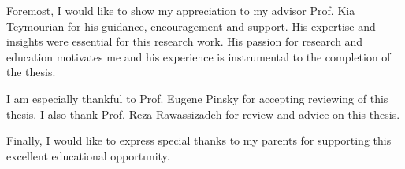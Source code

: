 Foremost, I would like to show my appreciation to my advisor Prof. Kia Teymourian for his guidance, encouragement and support.
His expertise and insights were essential for this research work. His passion for research and education motivates me and his experience is instrumental to the completion of the thesis.

I am especially thankful to Prof. Eugene Pinsky for accepting reviewing of this thesis. 
I also thank Prof. Reza Rawassizadeh for review and advice on this thesis.

Finally, I would like to express special thanks to my parents for supporting this excellent educational opportunity. 
